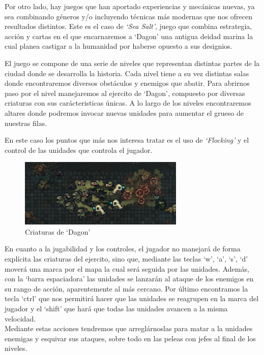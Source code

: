 Por otro lado, hay juegos que han aportado experiencias y mecánicas nuevas, ya sea combinando
géneros y/o incluyendo técnicas más modernas que nos ofrecen resultados distintos. Este es el
caso de \textit{`Sea Salt'}, juego que combina estrategia, acción y cartas en el que encarnaremos 
a `Dagon' una antigua deidad marina la cual planea castigar a la humanidad por haberse 
opuesto a sus designios.

El juego se compone de una serie de niveles que representan distintas partes de la ciudad
donde se desarrolla la historia. Cada nivel tiene a su vez distintas salas donde encontraremos
diversos obstáculos y enemigos que abatir. Para abrirnos paso por el nivel manejaremos al
ejercito de `Dagon', compuesto por diversas criaturas con sus carácteristicas 
únicas. A lo largo de los niveles encontraremos altares donde podremos invocar nuevas unidades
para aumentar el grueso de nuestras filas. 

En este caso los puntos que más nos interesa tratar es el uso de \textit{`Flocking'} y el 
control de las unidades que controla el jugador.

\begin{figure}[ht]
\centering
\includegraphics[width=0.7\textwidth]{imagenes/marco_teo/referentes/ss_4.png}
\caption{Criaturas de `Dagon'}
\label{img:ss_4}
\end{figure}

En cuanto a la jugabilidad y los controles, el jugador no manejará de forma
explícita las criaturas del ejercito, sino que, mediante las teclas `w', `a', `s', `d'
moverá una marca por el mapa la cual será seguida por las unidades. Además, con la
`barra espaciadora' las unidades se lanzarán al ataque de los enemigos en su rango de 
acción, aparentemente al más cercano. Por último encontramos la tecla `ctrl' que
nos permitirá hacer que las unidades se reagrupen en la marca del jugador y el `shift' que 
hará que todas las unidades avancen a la misma velocidad. \\
Mediante estas acciones tendremos que arreglárnoslas para matar a la unidades enemigas y
esquivar sus ataques, sobre todo en las peleas con jefes al final de los niveles.

